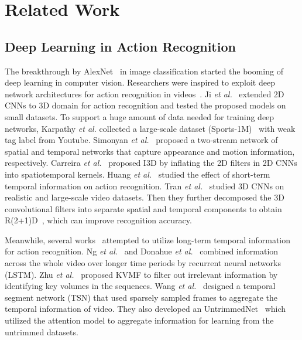 \documentclass[journal]{IEEEtran}
\begin{document}
\section{Related Work}
\label{sec:rw}

\subsection{Deep Learning in Action Recognition}
The breakthrough by AlexNet~\cite{KrizhevskySH12} in image classification started the booming of deep learning in computer vision.
Researchers were inspired to exploit deep network architectures for action recognition in videos~\cite{JiXYY13,KarpathyTSLSF14,SimonyanZ14,Wang0T15,CarreiraZ17,HuangRMTPFN18,TranBFTP15,R2+1D,ArtNet,LiuLWWTWLHL20,Feichtenhofer0M19}.
Ji \emph{et al.}~\cite{JiXYY13} extended 2D CNNs to 3D domain for action recognition and tested the proposed models on small datasets.
To support a huge amount of data needed for training deep networks, Karpathy \emph{et al.} collected a large-scale dataset (Sports-1M)~\cite{KarpathyTSLSF14} with weak tag label from Youtube.
Simonyan \emph{et al.}~\cite{ SimonyanZ14} proposed a two-stream network of spatial and temporal networks that capture appearance and motion information, respectively.
Carreira \emph{et al.}~\cite{CarreiraZ17} proposed I3D by inflating the 2D filters in 2D CNNs into spatiotemporal kernels.
Huang \emph{et al.}~\cite{ HuangRMTPFN18} studied the effect of short-term temporal information on action recognition.
Tran \emph{et al.}~\cite{TranBFTP15} studied 3D CNNs on realistic and large-scale video datasets. Then they further decomposed the 3D convolutional filters into separate spatial and temporal components to obtain R(2+1)D~\cite{R2+1D}, which can improve recognition accuracy.

Meanwhile, several works~\cite{NgHVVMT15,DonahueHGRVDS15,ZhuHSCQ16,TSN-J,WangXLG17,FanXZYGY18} attempted to utilize long-term temporal information for action recognition.
Ng \emph{et al.}~\cite{NgHVVMT15} and Donahue \emph{et al.}~\cite{DonahueHGRVDS15} combined information across the whole video over longer time periods by recurrent neural networks (LSTM).
Zhu \emph{et al.}~\cite{ZhuHSCQ16}  proposed KVMF to filter out irrelevant information by identifying key volumes in the sequences.
Wang \emph{et al.}~\cite{TSN-J} designed a temporal segment network (TSN) that used sparsely sampled frames to aggregate the temporal information of video. They also developed an UntrimmedNet~\cite{WangXLG17} which utilized the attention model to aggregate information for learning from the untrimmed datasets.
\end{document}
